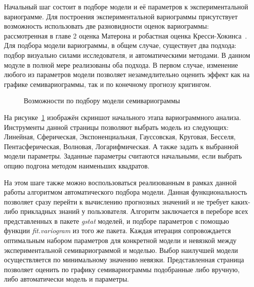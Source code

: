 Начальный шаг состоит в подборе модели и её параметров к экспериментальной вариограмме. Для построения экспериментальной вариограммы присутствует возможность использовать две разновидности оценок вариограммы: рассмотренная в главе 2 оценка Матерона и робастная оценка Кресси-Хокинса~\cite{cressie1993statistics}. Для подбора модели вариограммы, в общем случае, существует два подхода: подбор визуально силами исследователя, и автоматическими методами. В данном модуле в полной мере реализованы оба подхода. В первом случае, изменение любого из параметров модели позволяет незамедлительно оценить эффект как на графике семивариограммы, так и по конечному прогнозу кригингом.

\begin{figure}[ht]
\caption{Возможности по подбору модели семивариограммы}
\label{img:mod_variogram}
\end{figure}
На рисунке~\ref{img:mod_variogram} изображён скриншот начального этапа вариограммного анализа. Инструменты данной страницы позволяют выбрать модель из следующих: Линейная, Сферическая, Экспоненциальная, Гауссовская, Круговая, Бесселя, Пентасферическая, Волновая, Логарифмическая. А также задать к выбранной модели параметры. Заданные параметры считаются начальными, если выбрать опцию подгона методом наименьших квадратов.

На этом шаге также можно воспользоваться реализованным в рамках данной работы алгоритмом автоматического подбора модели. Данная функциональность позволяет сразу перейти к вычислению прогнозных значений и не требует каких-либо прикладных знаний у пользователя. Алгоритм заключается в переборе всех представленных в пакете \textit{gstat} моделей, и подборе параметров с помощью функции \textit{fit.variogram} из того же пакета. Каждая итерация сопровождается оптимальным набором параметров для конкретной модели и невязкой между экспериментальной семивариограммой и моделью. Выбор наилучшей модели осуществляется по минимальному значению невязки. Представленная страница позволяет оценить по графику семивариограммы подобранные либо вручную, либо автоматически модель и параметры.

